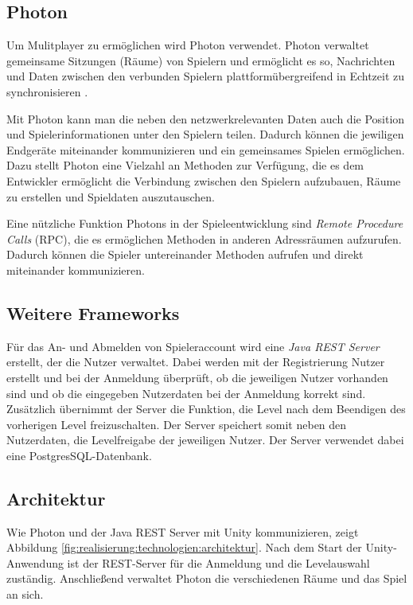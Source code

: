 
\subsection{Photon}
\label{subsec:realisierung:technologien:photon}
Um Mulitplayer zu ermöglichen wird Photon verwendet. Photon verwaltet gemeinsame Sitzungen (Räume) von Spielern und ermöglicht es so, Nachrichten und Daten zwischen den verbunden Spielern plattformübergreifend in Echtzeit zu synchronisieren \cite{photon}.

Mit Photon kann man die neben den netzwerkrelevanten Daten auch die Position und Spielerinformationen unter den Spielern teilen. Dadurch können die jewiligen Endgeräte miteinander kommunizieren und ein gemeinsames Spielen ermöglichen. Dazu stellt Photon eine Vielzahl an Methoden zur Verfügung, die es dem Entwickler ermöglicht die Verbindung zwischen den Spielern aufzubauen, Räume zu erstellen und Spieldaten auszutauschen.

Eine nützliche Funktion Photons in der Spieleentwicklung sind \textit{Remote Procedure Calls} (RPC), die es ermöglichen Methoden in anderen Adressräumen aufzurufen. Dadurch können die Spieler untereinander Methoden aufrufen und direkt miteinander kommunizieren.

\subsection{Weitere Frameworks}
\label{subsec:realisierung:technologien:frameworks}
Für das An- und Abmelden von Spieleraccount wird eine \textit{Java REST Server} erstellt, der die Nutzer verwaltet. Dabei werden mit der Registrierung Nutzer erstellt und bei der Anmeldung überprüft, ob die jeweiligen Nutzer vorhanden sind und ob die eingegeben Nutzerdaten bei der Anmeldung korrekt sind. Zusätzlich übernimmt der Server die Funktion, die Level nach dem Beendigen des vorherigen Level freizuschalten. Der Server speichert somit neben den Nutzerdaten, die Levelfreigabe der jeweiligen Nutzer. Der Server verwendet dabei eine PostgresSQL-Datenbank.

\subsection{Architektur}
\label{subsec:realisierung:technologien:architektur}
Wie Photon und der Java REST Server mit Unity kommunizieren, zeigt Abbildung \ref{fig:realisierung:technologien:architektur}. Nach dem Start der Unity-Anwendung ist der REST-Server für die Anmeldung und die Levelauswahl zuständig. Anschließend verwaltet Photon die verschiedenen Räume und das Spiel an sich.

